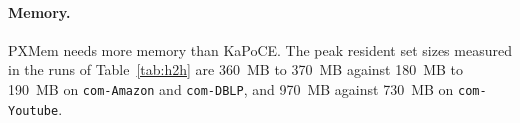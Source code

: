 \paragraph{Memory.}  PXMem needs more memory than KaPoCE.  The peak resident
set sizes measured in the runs of Table~\ref{tab:h2h} are \SI{360}{MB} to
\SI{370}{MB} against \SI{180}{MB} to \SI{190}{MB} on \texttt{com-Amazon} and
\texttt{com-DBLP}, and \SI{970}{MB} against \SI{730}{MB} on \texttt{com-Youtube}.
